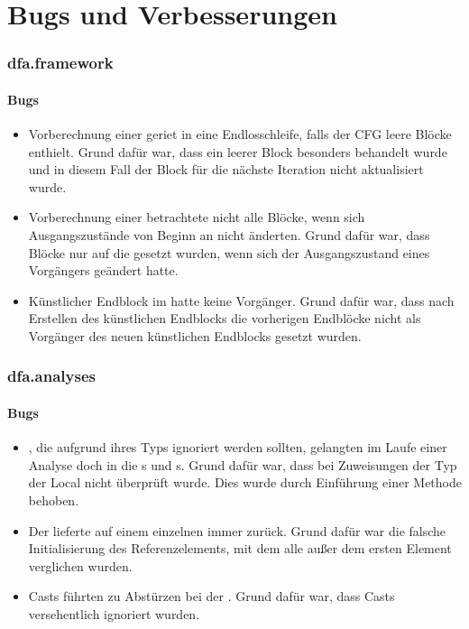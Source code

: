 \part{Bugs und Verbesserungen}

\section{dfa.framework}
\subsection{Bugs}

\begin{itemize}
	\item Vorberechnung einer  geriet in eine Endlosschleife, falls der CFG leere Blöcke enthielt.
	Grund dafür war, dass ein leerer Block besonders behandelt wurde und in diesem Fall der Block für die nächste Iteration nicht aktualisiert wurde.
	\item Vorberechnung einer  betrachtete nicht alle Blöcke, wenn sich Ausgangszustände von Beginn an nicht änderten. Grund dafür war, dass Blöcke nur auf die  gesetzt wurden, wenn sich der Ausgangszustand eines Vorgängers geändert hatte. 
	\item Künstlicher Endblock im  hatte keine Vorgänger. Grund dafür war, dass nach Erstellen des künstlichen Endblocks die vorherigen Endblöcke nicht als Vorgänger des neuen künstlichen Endblocks gesetzt wurden.
\end{itemize}

\section{dfa.analyses}
\subsection{Bugs}

\begin{itemize}
	\item {}, die aufgrund ihres Typs ignoriert werden sollten, gelangten im Laufe einer Analyse doch in die s und s. Grund dafür war, dass bei Zuweisungen der Typ der Local nicht überprüft wurde. Dies wurde durch Einführung einer Methode  behoben.
	\item Der  lieferte auf einem einzelnen  immer  zurück. Grund dafür war die falsche Initialisierung des Referenzelements, mit dem alle außer dem ersten Element verglichen wurden.
	\item Casts führten zu Abstürzen bei der . Grund dafür war, dass Casts versehentlich ignoriert wurden.
\end{itemize}


